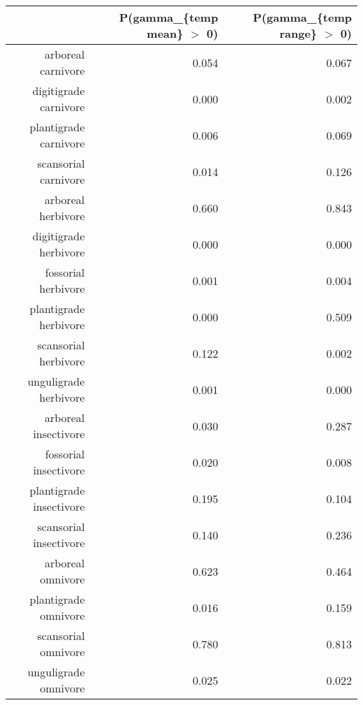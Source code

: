 \begin{table}[ht]
\centering
\begin{tabular}{rrr}
  \hline
 & P(gamma\_\{temp mean\} $>$ 0) & P(gamma\_\{temp range\} $>$ 0) \\ 
  \hline
arboreal carnivore & 0.054 & 0.067 \\ 
  digitigrade carnivore & 0.000 & 0.002 \\ 
  plantigrade carnivore & 0.006 & 0.069 \\ 
  scansorial carnivore & 0.014 & 0.126 \\ 
  arboreal herbivore & 0.660 & 0.843 \\ 
  digitigrade herbivore & 0.000 & 0.000 \\ 
  fossorial herbivore & 0.001 & 0.004 \\ 
  plantigrade herbivore & 0.000 & 0.509 \\ 
  scansorial herbivore & 0.122 & 0.002 \\ 
  unguligrade herbivore & 0.001 & 0.000 \\ 
  arboreal insectivore & 0.030 & 0.287 \\ 
  fossorial insectivore & 0.020 & 0.008 \\ 
  plantigrade insectivore & 0.195 & 0.104 \\ 
  scansorial insectivore & 0.140 & 0.236 \\ 
  arboreal omnivore & 0.623 & 0.464 \\ 
  plantigrade omnivore & 0.016 & 0.159 \\ 
  scansorial omnivore & 0.780 & 0.813 \\ 
  unguligrade omnivore & 0.025 & 0.022 \\ 
   \hline
\end{tabular}
\label{tab:origin_temp}
\end{table}
